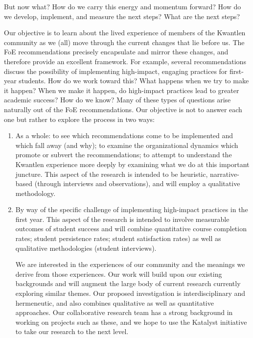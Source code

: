 \documentclass[letterpaper,10pt,headsepline]{scrreprt}
\begin{document}
But now what? How do we carry this energy and momentum forward? How do we
develop, implement, and measure the next steps? What are the next steps?

Our objective is to learn about the lived experience of members of the
Kwantlen community as we (all) move through the current changes that lie
before us. The FoE recommendations precisely encapsulate and mirror these
changes, and therefore provide an excellent framework. For example, several
recommendations discuss the possibility of implementing high-impact, engaging
practices for first-year students. How do we work toward this? What happens
when we try to make it happen? When we make it happen, do high-impact
practices lead to greater academic success? How do we know? Many of these
types of questions arise naturally out of the FoE recommendations. Our
objective is not to answer each one but rather to explore the process in two
ways:

\begin{enumerate}
\item As a whole: to see which recommendations come to be implemented and
  which fall away (and why); to examine the organizational dynamics which
  promote or subvert the recommendations; to attempt to understand the
  Kwantlen experience more deeply by examining what we do at this important
  juncture. This aspect of the research is intended to be heuristic,
  narrative-based (through interviews and observations), and will employ a
  qualitative methodology.

\item By way of the specific challenge of implementing high-impact practices
  in the first year. This aspect of the research is intended to involve
  measurable outcomes of student success and will combine quantitative course
  completion rates; student persistence rates; student satisfaction rates) as
  well as qualitative methodologies (student interviews).

  We are interested in the experiences of our community and the meanings we
  derive from those experiences. Our work will build upon our existing
  backgrounds and will augment the large body of current research currently
  exploring similar themes. Our proposed investigation is interdisciplinary
  and hermeneutic, and also combines qualitative as well as quantitative
  approaches. Our collaborative research team has a strong background in
  working on projects such as these, and we hope to use the Katalyst
  initiative to take our research to the next level.

\end{enumerate}
\end{document}
